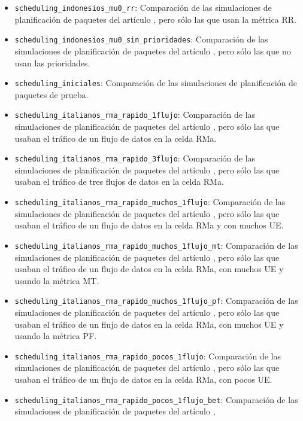 \documentclass[12pt]{report} %
\begin{document}
\begin{itemize}
Comparación de las simulaciones de planificación de paquetes del artículo \cite{RefWorks:67},
pero sólo las que usan el sistema de prioridades.
\item \verb|scheduling_indonesios_mu0_rr|:
Comparación de las simulaciones de planificación de paquetes del artículo \cite{RefWorks:67},
pero sólo las que usan la métrica RR.
\item \verb|scheduling_indonesios_mu0_sin_prioridades|:
Comparación de las simulaciones de planificación de paquetes del artículo \cite{RefWorks:67},
pero sólo las que no usan las prioridades.
\item \verb|scheduling_iniciales|:
Comparación de las simulaciones de planificación de paquetes de prueba.
\item \verb|scheduling_italianos_rma_rapido_1flujo|:
Comparación de las simulaciones de planificación de paquetes del artículo \cite{RefWorks:26},
pero sólo las que usaban el tráfico de un flujo de datos en la celda RMa.
\item \verb|scheduling_italianos_rma_rapido_3flujo|:
Comparación de las simulaciones de planificación de paquetes del artículo \cite{RefWorks:26},
pero sólo las que usaban el tráfico de tres flujos de datos en la celda RMa.
\item \verb|scheduling_italianos_rma_rapido_muchos_1flujo|:
Comparación de las simulaciones de planificación de paquetes del artículo \cite{RefWorks:26},
pero sólo las que usaban el tráfico de un flujo de datos en la celda RMa y con muchos UE.
\item \verb|scheduling_italianos_rma_rapido_muchos_1flujo_mt|:
Comparación de las simulaciones de planificación de paquetes del artículo \cite{RefWorks:26},
pero sólo las que usaban el tráfico de un flujo de datos en la celda RMa, con muchos UE y usando la métrica MT.
\item \verb|scheduling_italianos_rma_rapido_muchos_1flujo_pf|:
Comparación de las simulaciones de planificación de paquetes del artículo \cite{RefWorks:26},
pero sólo las que usaban el tráfico de un flujo de datos en la celda RMa, con muchos UE y usando la métrica PF.
\item \verb|scheduling_italianos_rma_rapido_pocos_1flujo|:
Comparación de las simulaciones de planificación de paquetes del artículo \cite{RefWorks:26},
pero sólo las que usaban el tráfico de un flujo de datos en la celda RMa, con pocos UE.
\item \verb|scheduling_italianos_rma_rapido_pocos_1flujo_bet|:
Comparación de las simulaciones de planificación de paquetes del artículo \cite{RefWorks:26},

\end{itemize}
\end{document}
